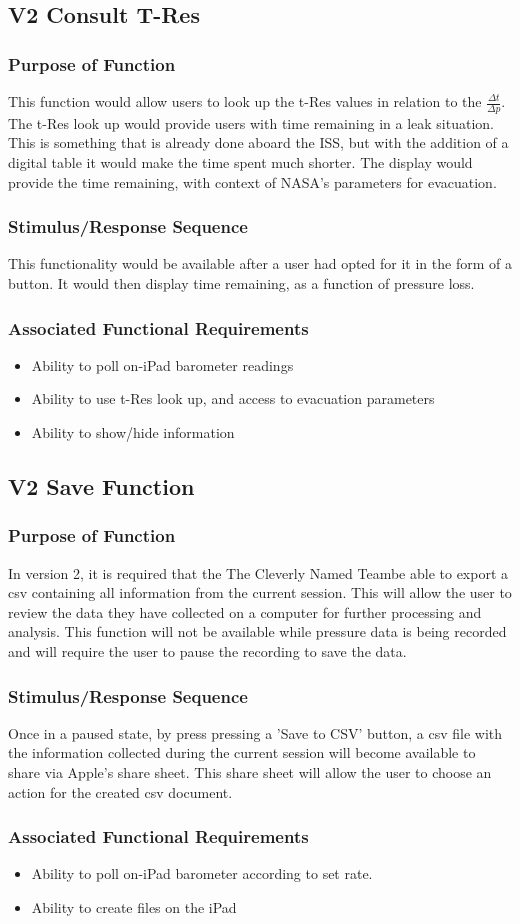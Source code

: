 \documentclass[onecolumn, draftclsnofoot,10pt, compsoc]{IEEEtran}
\def \CapstoneTeamName{The Cleverly Named Team}
\begin{document}
\subsection{V2 Consult T-Res}
\subsubsection{Purpose of Function}
This function would allow users to look up the t-Res values in relation to the $\frac{\Delta t}{\Delta p}$.
The t-Res look up would provide users with time remaining in a leak situation.
This is something that is already done aboard the ISS, but with the addition of a digital table it would make the time spent much shorter.
The display would provide the time remaining, with context of NASA's parameters for evacuation.
\subsubsection{Stimulus/Response Sequence}
This functionality would be available after a user had opted for it in the form of a button.
It would then display time remaining, as a function of pressure loss.
\subsubsection{Associated Functional Requirements}
\begin{itemize}
\item Ability to poll on-iPad barometer readings
\item Ability to use t-Res look up, and access to evacuation parameters
\item Ability to show/hide information
\end{itemize}

\subsection{V2 Save Function}
\subsubsection{Purpose of Function}
In version 2, it is required that the \CapstoneTeamName be able to export a csv containing all information from the current session.
This will allow the user to review the data they have collected on a computer for further processing and analysis.
This function will not be available while pressure data is being recorded and will require the user to pause the recording to save the data.
\subsubsection{Stimulus/Response Sequence}
Once in a paused state, by press pressing a 'Save to CSV' button, a csv file with the information collected during the current session will become available to share via Apple's share sheet.
This share sheet will allow the user to choose an action for the created csv document.
\subsubsection{Associated Functional Requirements}
\begin{itemize}
\item Ability to poll on-iPad barometer according to set rate.
\item Ability to create files on the iPad
\end{itemize}
\end{document}
